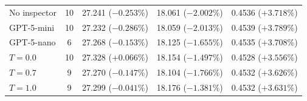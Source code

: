 \documentclass[a4paper,fleqn]{cas-sc}
\begin{document}
\begin{table}[]
\begin{tabular}{@{}l c r r r@{}}
  No inspector          & 10 & 27.241 ($-0.253$\%) & 18.061 ($-2.002$\%) & 0.4536 ($+3.718$\%) \\                                           
  GPT-5-mini            & 10 & 27.232 ($-0.286$\%) & 18.059 ($-2.013$\%) & 0.4539 ($+3.789$\%) \\                                           
  GPT-5-nano            & 6  & 27.268 ($-0.153$\%) & 18.125 ($-1.655$\%) & 0.4535 ($+3.708$\%) \\                                           
  $T=0.0$               & 10 & 27.328 ($+0.066$\%) & 18.154 ($-1.497$\%) & 0.4528 ($+3.556$\%) \\                                           
  $T=0.7$               & 9  & 27.270 ($-0.147$\%) & 18.104 ($-1.766$\%) & 0.4532 ($+3.626$\%) \\                                           
  $T=1.0$               & 9  & 27.299 ($-0.041$\%) & 18.176 ($-1.381$\%) & 0.4532 ($+3.631$\%) \\                                           
  \bottomrule                                                                                                                               
  \end{tabular}                                                                                                                             
  \end{table}                                                                                                                               
                                                                                                                                            
\end{document}
